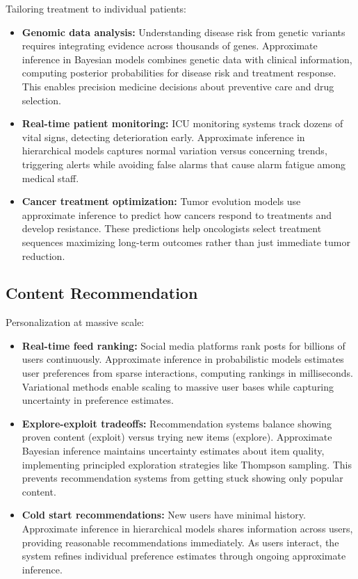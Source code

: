 Tailoring treatment to individual patients:

\begin{itemize}
    \item \textbf{Genomic data analysis:} Understanding disease risk from genetic variants requires integrating evidence across thousands of genes. Approximate inference in Bayesian models combines genetic data with clinical information, computing posterior probabilities for disease risk and treatment response. This enables precision medicine decisions about preventive care and drug selection.
    
    \item \textbf{Real-time patient monitoring:} ICU monitoring systems track dozens of vital signs, detecting deterioration early. Approximate inference in hierarchical models captures normal variation versus concerning trends, triggering alerts while avoiding false alarms that cause alarm fatigue among medical staff.
    
    \item \textbf{Cancer treatment optimization:} Tumor evolution models use approximate inference to predict how cancers respond to treatments and develop resistance. These predictions help oncologists select treatment sequences maximizing long-term outcomes rather than just immediate tumor reduction.
\end{itemize}

\subsection{Content Recommendation}

Personalization at massive scale:

\begin{itemize}
    \item \textbf{Real-time feed ranking:} Social media platforms rank posts for billions of users continuously. Approximate inference in probabilistic models estimates user preferences from sparse interactions, computing rankings in milliseconds. Variational methods enable scaling to massive user bases while capturing uncertainty in preference estimates.
    
    \item \textbf{Explore-exploit tradeoffs:} Recommendation systems balance showing proven content (exploit) versus trying new items (explore). Approximate Bayesian inference maintains uncertainty estimates about item quality, implementing principled exploration strategies like Thompson sampling. This prevents recommendation systems from getting stuck showing only popular content.
    
    \item \textbf{Cold start recommendations:} New users have minimal history. Approximate inference in hierarchical models shares information across users, providing reasonable recommendations immediately. As users interact, the system refines individual preference estimates through ongoing approximate inference.
\end{itemize}

